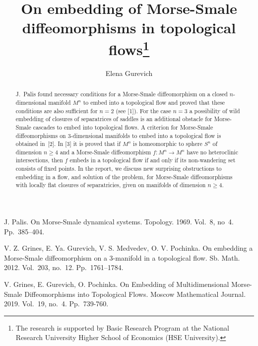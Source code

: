 \documentclass[12pt]{llncs}
\begin{document}
\fi

\title{On embedding of Morse-Smale diffeomorphisms in topological flows\thanks{The research is supported by   Basic Research Program at the National Research University Higher School of Economics (HSE University).}}

\author{Elena Gurevich
  }

\maketitle

\begin{abstract}
J.~Palis found necessary  conditions for  a Morse-Smale diffeomorphism on a closed $n$-dimensional manifold $M^n$  to  embed into a topological  flow and proved that these conditions are also sufficient for $n=2$ (see [1]).  For the case $n=3$ a possibility of  wild embedding of closures of separatrices of saddles is an additional obstacle  for Morse-Smale cascades to embed into topological flows. A criterion for Morse-Smale diffeomorphisms on  3-dimensional manifolds to embed into a topological  flow is obtained in~[2].    In [3] it is proved that if $M^n$ is homeomorphic to sphere $S^n$ of dimension $n\geq 4$ and a Morse-Smale diffeomorphism $f: M^n\to M^n$  have no  heteroclinic intersections, then $f$ embeds in a topological flow if and only if its non-wandering set consists of fixed points. In the report, we discuss new surprising obstructions  to embedding in  a flow,  and solution of the problem, for  Morse-Smale diffeomorphisms with locally flat closures of separatricies,  given on  manifolds of dimension $n\geq 4$.  

\end{abstract}


\begin{thebibliography}{9} %
 J. Palis.  On Morse-Smale dynamical systems. Topology. 1969. Vol.~8, no~4. Pp.~385--404.

 V. Z. Grines, E. Ya. Gurevich, V. S. Medvedev, O. V. Pochinka. On embedding a Morse-Smale diffeomorphism on a 3-manifold in a topological flow.  Sb. Math. 2012. Vol.~203, no.~12. Pp.~1761--1784.

 V. Grines, E. Gurevich, O. Pochinka.   On Embedding of Multidimensional Morse-Smale Diffeomorphisms into Topological Flows.  Moscow Mathematical Journal. 2019. Vol.~19, no.~4. Pp.~739-760.

\end{thebibliography}
\end{document}
